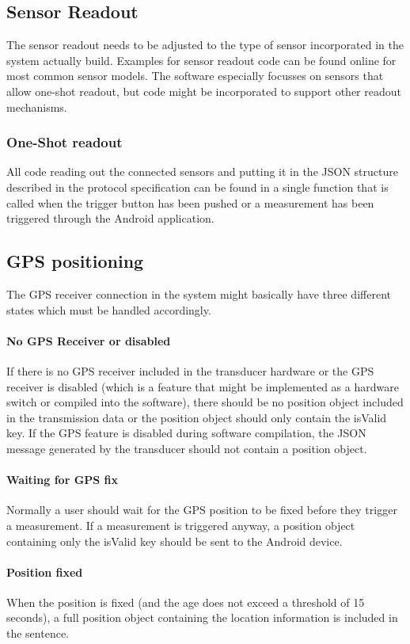 \subsection{Sensor Readout}
The sensor readout needs to be adjusted to the type of sensor incorporated in the system actually build. Examples for sensor readout code can be found online for most common sensor models. The software especially focusses on sensors that allow one-shot readout, but code might be incorporated to support other readout mechanisms.

\subsubsection{One-Shot readout}
All code reading out the connected sensors and putting it in the JSON structure described in the protocol specification can be found in a single function that is called when the trigger button has been pushed or a measurement has been triggered through the Android application.

\subsection{GPS positioning}
The GPS receiver connection in the system might basically have three different states which must be handled accordingly.

\paragraph{No GPS Receiver or disabled}
If there is no GPS receiver included in the transducer hardware or the GPS receiver is disabled (which is a feature that might be implemented as a hardware switch or compiled into the software), there should be no position object included in the transmission data or the position object should only contain the isValid key. If the GPS feature is disabled during software compilation, the JSON message generated by the transducer should not contain a position object.

\paragraph{Waiting for GPS fix}
Normally a user should wait for the GPS position to be fixed before they trigger a measurement. If a measurement is triggered anyway, a position object containing only the isValid key should be sent to the Android device.

\paragraph{Position fixed}
When the position is fixed (and the age does not exceed a threshold of 15 seconds), a full position object containing the location information is included in the sentence.

